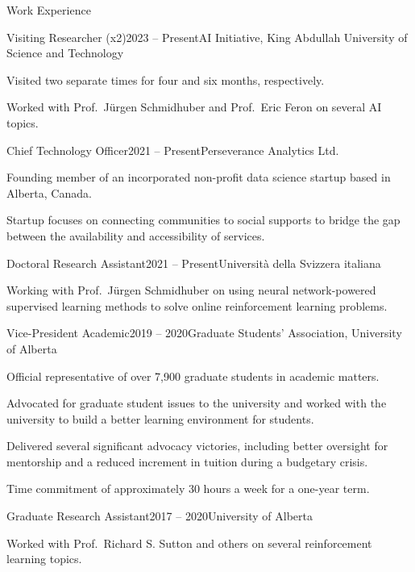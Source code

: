 \documentclass{cv}
\begin{document}
\begin{rSection}{Work Experience}

\begin{rSubsection}{Visiting Researcher (x2)}{2023 -- Present}{AI Initiative, King Abdullah University of Science and Technology}
    \item Visited two separate times for four and six months, respectively.
    \item Worked with Prof.\ J{\"{u}}rgen Schmidhuber and Prof.\ Eric Feron on several AI topics.
\end{rSubsection}

\begin{rSubsection}{Chief Technology Officer}{2021 -- Present}{Perseverance Analytics Ltd.}
    \item Founding member of an incorporated non-profit data science startup based in Alberta, Canada.
    \item Startup focuses on connecting communities to social supports to bridge the gap between the availability and accessibility of services.
\end{rSubsection}

\begin{rSubsection}{Doctoral Research Assistant}{2021 -- Present}{Universit{\`{a}} della Svizzera italiana}
    \item Working with Prof.\ J{\"{u}}rgen Schmidhuber on using neural network-powered supervised learning methods to solve online reinforcement learning problems.
\end{rSubsection}

\begin{rSubsection}{Vice-President Academic}{2019 -- 2020}{Graduate Students' Association, University of Alberta}
    \item Official representative of over 7,900 graduate students in academic matters.
    \item Advocated for graduate student issues to the university and worked with the university to build a better learning environment for students.
    \item Delivered several significant advocacy victories, including better oversight for mentorship and a reduced increment in tuition during a budgetary crisis.
    \item Time commitment of approximately 30 hours a week for a one-year term.
\end{rSubsection}

\begin{rSubsection}{Graduate Research Assistant}{2017 -- 2020}{University of Alberta}
    \item Worked with Prof.\ Richard S. Sutton and others on several reinforcement learning topics.
\end{rSubsection}


\end{rSection}
\end{document}
